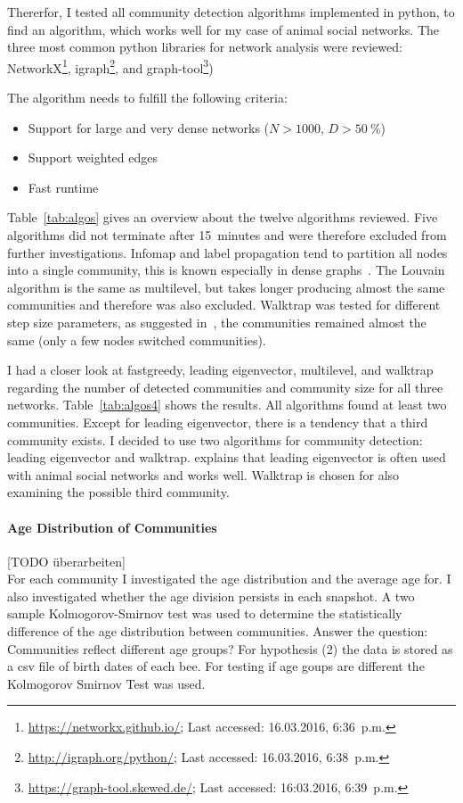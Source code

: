 Thererfor, I tested all community detection algorithms implemented in python, to find an algorithm, which works well for my case of animal social networks. The three most common python libraries for network analysis were reviewed: NetworkX\footnote{\url{https://networkx.github.io/}; Last accessed: 16.03.2016, 6:36~p.m.}, igraph\footnote{\url{http://igraph.org/python/}; Last accessed: 16.03.2016, 6:38~p.m.}, and graph-tool\footnote{\url{https://graph-tool.skewed.de/}; Last accessed: 16:03.2016, 6:39~p.m.})

The algorithm needs to fulfill the following criteria:

\begin{itemize}
\item Support for large and very dense networks ($N>1000$, $D>50~\%$)
\item Support weighted edges
\item Fast runtime
\end{itemize}

Table~\ref{tab:algos} gives an overview about the twelve algorithms reviewed. Five algorithms did not terminate after 15~minutes and were therefore excluded from further investigations. Infomap and label propagation tend to partition all nodes into a single community, this is known especially in dense graphs~\cite{yang2016comparative, fortunato2010community}.
The Louvain algorithm is the same as multilevel, but takes longer producing almost the same communities and therefore was also excluded. Walktrap was tested for different step size parameters, as suggested in~\cite{pons2005computing}, the communities remained almost the same (only a few nodes switched communities). 

I had a closer look at fastgreedy, leading eigenvector, multilevel, and walktrap regarding the number of detected communities and community size for all three networks. Table~\ref{tab:algos4} shows the results. All algorithms found at least two communities. Except for leading eigenvector, there is a tendency that a third community exists.
I decided to use two algorithms for community detection: leading eigenvector and walktrap. \textcite{farine2015constructing} explains that leading eigenvector is often used with animal social networks and works well. Walktrap is chosen for also  examining the possible third community.




\paragraph{Age Distribution of Communities}
[TODO überarbeiten]\\
For each community I investigated the age distribution and the average age for. I also investigated whether the age division persists in each snapshot. A two sample Kolmogorov-Smirnov test was used to determine the statistically difference of the age distribution between communities.
Answer the question: Communities reflect different age groups?
For hypothesis (2) the data is stored as a csv file of birth dates of each bee. For testing if age goups are different the Kolmogorov Smirnov Test was used.\\


